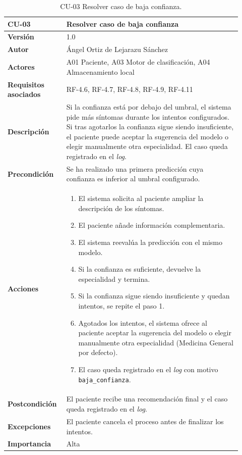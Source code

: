 \begin{table}[H]
	\centering
	\begin{tabular}{ p{0.21\linewidth} p{0.71\linewidth} }
		\toprule
		\textbf{CU-03}    & \textbf{Resolver caso de baja confianza}\\
		\toprule
		\textbf{Versión}              & 1.0 \\
		\textbf{Autor}                & Ángel Ortiz de Lejarazu Sánchez \\
		\textbf{Actores}              & A01 Paciente, A03 Motor de clasificación, A04 Almacenamiento local \\
		\textbf{Requisitos asociados} & RF-4.6, RF-4.7, RF-4.8, RF-4.9, RF-4.11 \\
		\textbf{Descripción}          & Si la confianza está por debajo del umbral, el sistema pide más síntomas durante los intentos configurados. Si tras agotarlos la confianza sigue siendo insuficiente, el paciente puede aceptar la sugerencia del modelo o elegir manualmente otra especialidad. El caso queda registrado en el \textit{log}. \\
		\textbf{Precondición}         & Se ha realizado una primera predicción cuya confianza es inferior al umbral configurado. \\
		\textbf{Acciones}             &
		\begin{enumerate}
			\def\labelenumi{\arabic{enumi}.}
			\item El sistema solicita al paciente ampliar la descripción de los síntomas.
			\item El paciente añade información complementaria.
			\item El sistema reevalúa la predicción con el mismo modelo.
			\item Si la confianza es suficiente, devuelve la especialidad y termina.
			\item Si la confianza sigue siendo insuficiente y quedan intentos, se repite el paso 1.
			\item Agotados los intentos, el sistema ofrece al paciente aceptar la sugerencia del modelo o elegir manualmente otra especialidad (Medicina General por defecto).
			\item El caso queda registrado en el \textit{log} con motivo \texttt{baja\_confianza}.
		\end{enumerate} \\
		\textbf{Postcondición}        & El paciente recibe una recomendación final y el caso queda registrado en el \textit{log}. \\
		\textbf{Excepciones}          & El paciente cancela el proceso antes de finalizar los intentos. \\
		\textbf{Importancia}          & Alta \\
		\bottomrule
	\end{tabular}
	\caption{CU-03 Resolver caso de baja confianza.}
\end{table}

